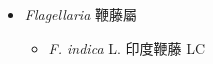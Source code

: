 
  \begin{itemize}
 \item[] \textit{Flagellaria} 鞭藤屬
                                
  \begin{itemize}
        \item[] \textit{F. indica} L.  印度鞭藤   LC
  \end{itemize}
  \end{itemize}

